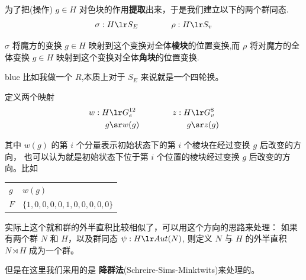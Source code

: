 \documentclass[12pt]{article}
\begin{document}
为了把(操作) $g\in H$ 对色块的作用{\bf 提取}出来，于是我们建立以下的两个群同态.
\begin{align}
    \sigma: H \lr S_E
    \hspace*{4em}
    \rho: H \lr S_v   
\end{align}

$\sigma$ 将魔方的变换 $g\in H$ 映射到这个变换对全体{\bf 棱块}的位置变换,而
$\rho$ 将对魔方的全体变换 $g\in H$ 映射到这个变换对全体{\bf 角块}的位置变换.

\begin{formal}{blue}
    比如我做一个 $R$,本质上对于 $S_E$ 来说就是一个四轮换。
\end{formal}


定义两个映射 
\begin{align}
    \begin{aligned}
        w: H & \lr G_e^{12} \\
        g & \sr w(g) 
    \end{aligned}
    \hspace*{4em}
    \begin{aligned}
        z: H & \lr G_v^{8} \\
        g & \sr z(g) 
    \end{aligned}
\end{align}

其中 $w(g)$ 的第 $i$ 个分量表示初始状态下的第 $i$ 个棱块在经过变换 $g$ 后改变的方向，
也可以认为就是初始状态下位于第 $i$ 个位置的棱块经过变换 $g$ 后改变的方向。比如

\begin{center}
    \begin{tabular}{p{.45\linewidth}p{.45\linewidth}}
        \toprule
        $g$ & $w(g)$\\
        $F$ & $\{1,0,0,0,0,1,0,0,0,0,0\}$\\
        \bottomrule
    \end{tabular}
\end{center}

实际上这个就和群的外半直积比较相似了，可以用这个方向的思路来处理：
如果有两个群 $N$ 和 $H$，以及群同态 $\psi:H \lr Aut(N)$, 则定义 $N$ 与 $H$
的外半直积 $N\rtimes H$ 成为一个群。

但是在这里我们采用的是 {\bf 降群法}(Schreire-Sims-Minktwits)来处理的。
\end{document}
